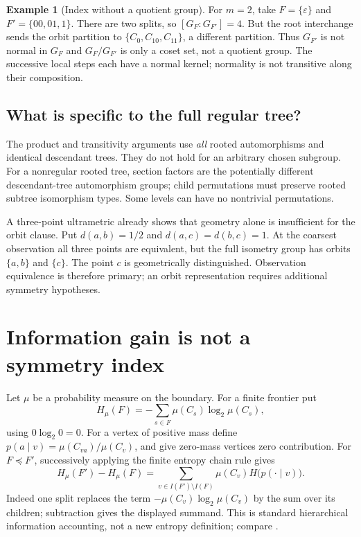 \documentclass[11pt]{article}
\theoremstyle{definition}
\newtheorem{example}[theorem]{Example}
\theoremstyle{remark}
\newcommand{\eps}{\varepsilon}
\begin{document}
\begin{example}[Index without a quotient group]\label{ex:nonnormal}
For $m=2$, take $F=\{\eps\}$ and $F'=\{00,01,1\}$. There are two splits, so $[G_F:G_{F'}]=4$. But the root interchange sends the orbit partition to $\{C_0,C_{10},C_{11}\}$, a different partition. Thus $G_{F'}$ is not normal in $G_F$ and $G_F/G_{F'}$ is only a coset set, not a quotient group. The successive local steps each have a normal kernel; normality is not transitive along their composition.
\end{example}

\subsection{What is specific to the full regular tree?}
The product and transitivity arguments use \emph{all} rooted automorphisms and identical descendant trees. They do not hold for an arbitrary chosen subgroup. For a nonregular rooted tree, section factors are the potentially different descendant-tree automorphism groups; child permutations must preserve rooted subtree isomorphism types. Some levels can have no nontrivial permutations.

A three-point ultrametric already shows that geometry alone is insufficient for the orbit clause. Put $d(a,b)=1/2$ and $d(a,c)=d(b,c)=1$. At the coarsest observation all three points are equivalent, but the full isometry group has orbits $\{a,b\}$ and $\{c\}$. The point $c$ is geometrically distinguished. Observation equivalence is therefore primary; an orbit representation requires additional symmetry hypotheses.

\section{Information gain is not a symmetry index}\label{sec:information}
Let $\mu$ be a probability measure on the boundary. For a finite frontier put
\[
H_\mu(F)=-\sum_{s\in F}\mu(C_s)\log_2\mu(C_s),
\]
using $0\log_2 0=0$. For a vertex of positive mass define $p(a\mid v)=\mu(C_{va})/\mu(C_v)$, and give zero-mass vertices zero contribution. For $F\preceq F'$, successively applying the finite entropy chain rule gives
\begin{equation}\label{eq:entropy}
 H_\mu(F')-H_\mu(F)
 =\sum_{v\in I(F')\setminus I(F)}\mu(C_v)H\bigl(p(\cdot\mid v)\bigr).
\end{equation}
Indeed one split replaces the term $-\mu(C_v)\log_2\mu(C_v)$ by the sum over its children; subtraction gives the displayed summand. This is standard hierarchical information accounting, not a new entropy definition; compare \cite[Equations (7) and (10)]{Perotti2020}.
\end{document}
